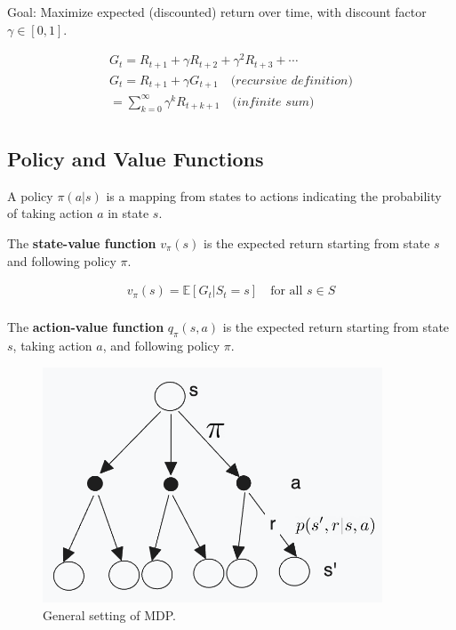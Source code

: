 Goal: Maximize expected (discounted) return over time, with discount factor $\gamma \in [0, 1]$.


\begin{equation} 
    \begin{split}
        G_t = R_{t+1} + \gamma R_{t+2} + \gamma^2 R_{t+3} + \cdots \\
        \label{eq:mdp-return}
        G_t = R_{t+1} + \gamma G_{t+1} \quad \textit{(recursive definition)} \\ 
        = \sum_{k=0}^{\infty} \gamma^k R_{t+k+1} \quad \textit{(infinite sum)} \\
    \end{split}
 \end{equation}

\subsection{Policy and Value Functions}
A policy $\pi(a|s)$ is a mapping from states to actions indicating the probability of taking action $a$ in state $s$.

The \textbf{state-value function} $v_\pi(s)$ is the expected return starting from state $s$ and following policy $\pi$.

\begin{equation}
    \begin{split}
        v_\pi(s) = \mathbb{E}[G_t | S_t = s] \quad \text{for all } s \in S \\
        \label{eq:mdp-value-function}
    \end{split}
 \end{equation}

The \textbf{action-value function} $q_\pi(s, a)$ is the expected return starting from state $s$, taking action $a$, and following policy $\pi$.

\begin{figure}[h]
    \centering
    \includegraphics[width=0.9\textwidth]{img/backup_diagram1.png}
    \caption{General setting of MDP.}
    \label{fig:mdp-back-up-diagram}
 \end{figure}

